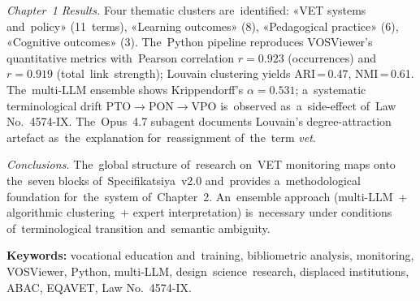 \textit{Chapter~1 Results.} Four thematic clusters are~identified: «VET systems and~policy» (11~terms), «Learning outcomes» (8), «Pedagogical practice» (6), «Cognitive outcomes» (3). The~Python pipeline reproduces VOSViewer's quantitative metrics with~Pearson correlation $r=0.923$ (occurrences) and~$r=0.919$ (total~link~strength); Louvain clustering yields ARI\,=\,0.47, NMI\,=\,0.61. The~multi-LLM ensemble shows Krippendorff's $\alpha=0.531$; a~systematic terminological drift PTO$\to$PON$\to$VPO is~observed as~a~side-effect of~Law No.~4574-IX. The~Opus~4.7 subagent documents Louvain's degree-attraction artefact as~the~explanation for~reassignment of~the~term \textit{vet}.

\textit{Conclusions.} The~global structure of~research on~VET monitoring maps onto the~seven blocks of~Specifikatsiya~v2.0 and~provides a~methodological foundation for~the~system of~Chapter~2. An~ensemble approach (multi-LLM~+ algorithmic clustering~+ expert interpretation) is~necessary under conditions of~terminological transition and~semantic ambiguity.

\textbf{Keywords:} vocational education and~training, bibliometric analysis, monitoring, VOSViewer, Python, multi-LLM, design~science~research, displaced institutions, ABAC, EQAVET, Law No.~4574-IX.
